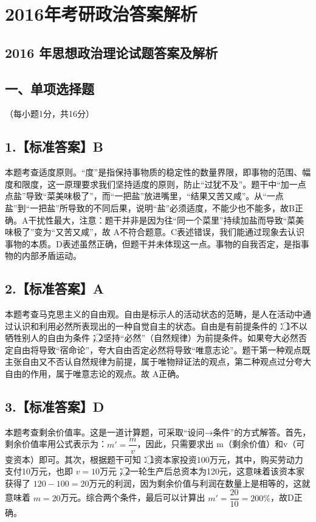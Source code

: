 \documentclass[UTF8,11pt]{ctexart}
\begin{document}
\section*{2016年考研政治答案解析}
\subsection*{2016 年思想政治理论试题答案及解析}

\subsection*{一、单项选择题}

（每小题1分，共16分）


\subsection*{1.【标准答案】B}

本题考查适度原则。“度”是指保持事物质的稳定性的数量界限，即事物的范围、幅度和限度，这一原理要求我们坚持适度的原则，防止“过犹不及”。题干中“加一点点盐”导致“菜美味极了”，而“一把盐”放进嘴里，“结果又苦又咸”。从“一点盐”到“一把盐”所导致的不同后果，说明“盐”必须适度，不能少也不能多，故B正确。A干扰性最大，注意：题干并非是因为往“同一个菜里”持续加盐而导致“菜美味极了”变为“又苦又咸”，故 A不符合题意。C表述错误，我们能通过现象去认识事物的本质。D表述虽然正确，但题干并未体现这一点。事物的自我否定，是指事物的内部矛盾运动。


\subsection*{2.【标准答案】A}

本题考查马克思主义的自由观。自由是标示人的活动状态的范畴，是人在活动中通过认识和利用必然所表现出的一种自觉自主的状态。自由是有前提条件的：\textcircled{1}不以牺牲别人的自由为条件；\textcircled{2}坚持“必然”（自然规律）为前提条件。如果夸大必然否定自由将导致“宿命论”，夸大自由否定必然将导致“唯意志论”。题干第一种观点既主张自由又不否认自然规律为前提，属于唯物辩证法的观点，第二种观点过分夸大自由的作用，属于唯意志论的观点。故 A正确。


\subsection*{3.【标准答案】D}

本题考查剩余价值率。这是一道计算题，可采取“设问→条件”的方式解答。首先，剩余价值率用公式表示为：\(\displaystyle m'=\dfrac{\displaystyle m}{\displaystyle v}\)，因此，只需要求出 m（剩余价值）和v（可变资本）即可。其次，根据题干可知：\textcircled{1}资本家投资100万元，其中，购买劳动力支付10万元，也即 \(\displaystyle v=10\)万元；\textcircled{2}一轮生产后总资本为120元，这意味着该资本家获得了 \(\displaystyle 120-100=20\)万元的利润，因为剩余价值与利润在数量上是相等的，这就意味着 \(\displaystyle m=20\)万元。综合两个条件，最后可以计算出 \(\displaystyle m'=\dfrac{\displaystyle 20}{\displaystyle 10}=200\%\)，故D正确。
\end{document}
